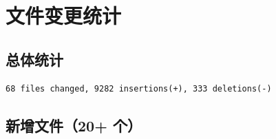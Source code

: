 \documentclass[11pt,a4paper]{article}
\begin{document}
\section{文件变更统计}

\subsection{总体统计}

\begin{verbatim}
68 files changed, 9282 insertions(+), 333 deletions(-)
\end{verbatim}

\subsection{新增文件（20+ 个）}
\end{document}
